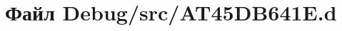 \hypertarget{_a_t45_d_b641_e_8d}{}\section{Файл Debug/src/\+A\+T45\+D\+B641E.d}
\label{_a_t45_d_b641_e_8d}
